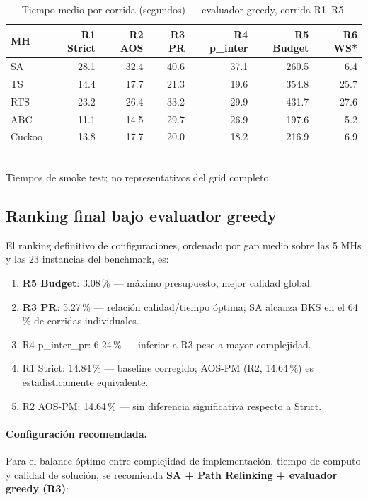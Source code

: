 \begin{table}[h]
\centering
\caption{Tiempo medio por corrida (segundos) — evaluador greedy, corrida R1--R5.}
\label{tab:tiempo-medio}
\small
\begin{tabular}{lrrrrrr}
\toprule
MH & R1 Strict & R2 AOS & R3 PR & R4 p\_inter & R5 Budget & R6 WS* \\
\midrule
SA      &  28.1 &  32.4 &  40.6 &  37.1 & 260.5 &   6.4 \\
TS      &  14.4 &  17.7 &  21.3 &  19.6 & 354.8 &  25.7 \\
RTS     &  23.2 &  26.4 &  33.2 &  29.9 & 431.7 &  27.6 \\
ABC     &  11.1 &  14.5 &  29.7 &  26.9 & 197.6 &   5.2 \\
Cuckoo  &  13.8 &  17.7 &  20.0 &  18.2 & 216.9 &   6.9 \\
\bottomrule
\end{tabular}
\\[4pt]
\footnotesize *Tiempos de smoke test; no representativos del grid completo.
\end{table}

\subsection{Ranking final bajo evaluador greedy}

El ranking definitivo de configuraciones, ordenado por gap medio
sobre las 5 MHs y las 23 instancias del benchmark, es:

\begin{enumerate}
\item \textbf{R5 Budget}: 3.08\,\% — máximo presupuesto, mejor calidad global.
\item \textbf{R3 PR}: 5.27\,\% — relación calidad/tiempo óptima;
      SA alcanza BKS en el 64\,\% de corridas individuales.
\item R4 p\_inter\_pr: 6.24\,\% — inferior a R3 pese a mayor complejidad.
\item R1 Strict: 14.84\,\% — baseline corregido; AOS-PM (R2, 14.64\,\%)
      es estadisticamente equivalente.
\item R2 AOS-PM: 14.64\,\% — sin diferencia significativa respecto a Strict.
\end{enumerate}

\paragraph{Configuración recomendada.}
Para el balance óptimo entre complejidad de implementación, tiempo de
computo y calidad de solución, se recomienda \textbf{SA + Path Relinking
+ evaluador greedy (R3)}:

